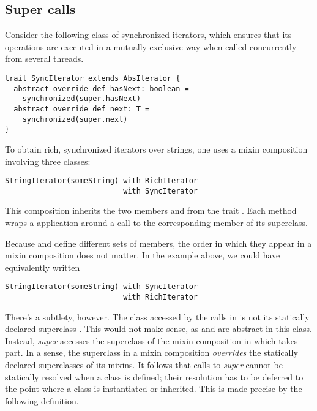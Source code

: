 \documentclass[a4paper,11pt,twoside]{article}
\begin{document}
\subsection*{Super calls}
Consider the following class of synchronized iterators, which ensures
that its operations are executed in a mutually exclusive way when
called concurrently from several threads.
\begin{lstlisting}
trait SyncIterator extends AbsIterator {
  abstract override def hasNext: boolean = 
    synchronized(super.hasNext)
  abstract override def next: T = 
    synchronized(super.next)
}
\end{lstlisting}
To obtain rich, synchronized iterators over strings, one uses a mixin
composition involving three classes:
\begin{lstlisting}
StringIterator(someString) with RichIterator 
                           with SyncIterator
\end{lstlisting}
This composition inherits the two members \lstinline@hasNext@ and
\lstinline@next@ from the trait \lstinline@SyncIterator@.  Each
method wraps a \lstinline@synchronized@ application around a call to
the corresponding member of its superclass. 

Because \lstinline@RichIterator@ and \lstinline@StringIterator@ define
different sets of members, the order in which they appear in a mixin
composition does not matter.
In the example above, we could have equivalently written
\begin{lstlisting}
StringIterator(someString) with SyncIterator 
                           with RichIterator
\end{lstlisting}
There's a subtlety, however.  The class accessed by the
 calls in \lstinline@SyncIterator@ is not its
statically declared superclass \lstinline@AbsIterator@. This would not
make sense, as \lstinline@hasNext@ and \lstinline@next@ are abstract
in this class.  Instead, {\em super} accesses the superclass
\lstinline@StringIterator@ of the mixin composition in which
\lstinline@SyncIterator@ takes part. In a sense, the superclass in a
mixin composition {\em overrides} the statically declared superclasses
of its mixins. It follows that calls to {\em super} cannot be
statically resolved when a class is defined; their resolution has to
be deferred to the point where a class is instantiated or inherited.
This is made precise by the following definition.
\end{document}

